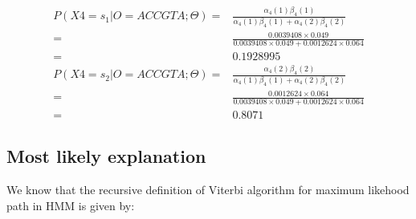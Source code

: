 \documentclass[a4paper,doc,notimes]{article}
\begin{document}
\begin{align*}
 P(X4=s_1 | O=ACCGTA; \Theta) = & \frac{\alpha_4(1) \beta_4(1)}{ \alpha_4(1) \beta_4(1) + \alpha_4(2) \beta_4(2) } \\
   = & \frac{0.0039408 \times 0.049 }{0.0039408 \times 0.049  + 0.0012624 \times 0.064 } \\
   = & 0.1928995 \\
  P(X4=s_2 | O=ACCGTA; \Theta) = & \frac{ \alpha_4(2) \beta_4(2)}{ \alpha_4(1) \beta_4(1) + \alpha_4(2) \beta_4(2) } \\
   = & \frac{ 0.0012624 \times 0.064 }{0.0039408 \times 0.049  + 0.0012624 \times 0.064 } \\
   = & 0.8071
\end{align*}

\subsection{Most likely explanation}
We know that the recursive definition of Viterbi algorithm for maximum likehood path in HMM is given by: \\
\end{document}
